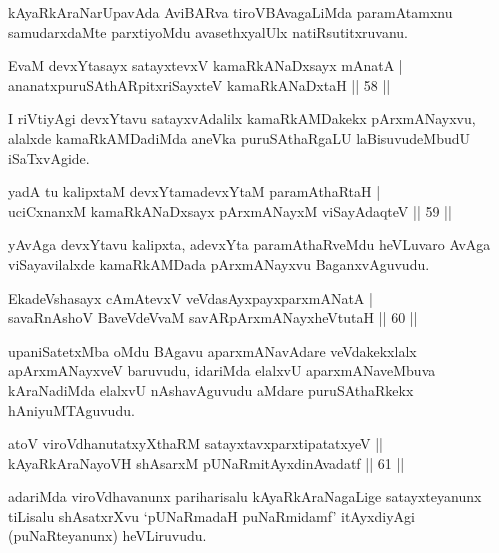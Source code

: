\begin{artha}
kAyaRkAraNarUpavAda AviBARva tiroVBAvagaLiMda paramAtamxnu samudarxdaMte parxtiyoMdu avasethxyalUlx natiRsutitxruvanu.
\end{artha}

\begin{shl}
EvaM devxYtasayx satayxtevxV kamaRkANaDxsayx mAnatA  | \\
ananatxpuruSAthARpitxriSayxteV kamaRkANaDxtaH \hfill||  58 ||  
\end{shl}

\begin{artha}
I riVtiyAgi devxYtavu satayxvAdalilx kamaRkAMDakekx pArxmANayxvu, alalxde kamaRkAMDadiMda aneVka puruSAthaRgaLU laBisuvudeMbudU iSaTxvAgide.
\end{artha}

\begin{shl}
yadA tu kalipxtaM devxYtamadevxYtaM paramAthaRtaH  | \\
uciCxnanxM kamaRkANaDxsayx pArxmANayxM viSayAdaqteV  \hfill||  59 ||  
\end{shl}

\begin{artha}
yAvAga devxYtavu kalipxta, adevxYta paramAthaRveMdu heVLuvaro AvAga viSayavilalxde kamaRkAMDada pArxmANayxvu BaganxvAguvudu. 
\end{artha}

\begin{shl}
EkadeVshasayx cAmAtevxV veVdasAyxpayxparxmANatA  | \\
savaRnAshoV BaveVdeVvaM savARpArxmANayxheVtutaH \hfill||  60 ||  
\end{shl}

\begin{artha}
upaniSatetxMba oMdu BAgavu aparxmANavAdare veVdakekxlalx apArxmANayxveV baruvudu, idariMda elalxvU aparxmANaveMbuva kAraNadiMda elalxvU nAshavAguvudu aMdare puruSAthaRkekx hAniyuMTAguvudu.
\end{artha}

\begin{shl}
atoV viroVdhanutatxyXthaRM satayxtavxparxtipatatxyeV ||  \\
kAyaRkAraNayoVH shAsarxM pUNaRmitAyxdinA\s vadatf \hfill||  61 ||  
\end{shl}

\begin{artha}
adariMda viroVdhavanunx pariharisalu kAyaRkAraNagaLige satayxteyanunx tiLisalu shAsatxrXvu `pUNaRmadaH puNaRmidamf' itAyxdiyAgi (puNaRteyanunx) heVLiruvudu.
\end{artha}

